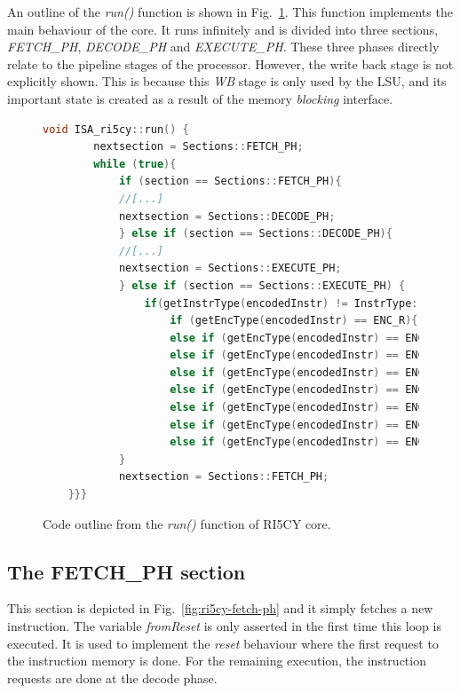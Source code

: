 An outline of the \textit{run()} function is shown in Fig.~\ref{fig:ri5cy-run-outline}. This function implements the main behaviour of the core. It runs infinitely and is divided into three sections, \textit{FETCH\_PH}, \textit{DECODE\_PH} and \textit{EXECUTE\_PH}. These three phases directly relate to the pipeline stages of the processor. However, the write back stage is not explicitly shown. This is because this \textit{WB} stage is only used by the LSU, and its important state is created as a result of the memory \textit{blocking} interface. 

\begin{figure}[htb!]
    \begin{lstlisting}[language=c++]
    void ISA_ri5cy::run() {
        nextsection = Sections::FETCH_PH;
        while (true){
            if (section == Sections::FETCH_PH){
            //[...]
            nextsection = Sections::DECODE_PH;
            } else if (section == Sections::DECODE_PH){
            //[...]
            nextsection = Sections::EXECUTE_PH;
            } else if (section == Sections::EXECUTE_PH) {
                if(getInstrType(encodedInstr) != InstrType::INSTR_UNKNOWN){
                    if (getEncType(encodedInstr) == ENC_R){...}
                    else if (getEncType(encodedInstr) == ENC_I_I){...}
                    else if (getEncType(encodedInstr) == ENC_I_L) {...}
                    else if (getEncType(encodedInstr) == ENC_S) {...} 
                    else if (getEncType(encodedInstr) == ENC_B) {...} 
                    else if (getEncType(encodedInstr) == ENC_U) {...} 
                    else if (getEncType(encodedInstr) == ENC_J) {...} 
                    else if (getEncType(encodedInstr) == ENC_I_J) {...}
            }
            nextsection = Sections::FETCH_PH;
    }}}\end{lstlisting}
    \caption{Code outline from the \textit{run()} function of RI5CY core.}
    \label{fig:ri5cy-run-outline}
\end{figure}

\subsection*{The FETCH\_PH section}

This section is depicted in Fig.~\ref{fig:ri5cy-fetch-ph} and it simply fetches a new instruction. The variable \textit{fromReset} is only asserted in the first time this loop is executed. It is used to implement the \textit{reset} behaviour where the first request to the instruction memory is done. For the remaining execution, the instruction requests are done at the decode phase.

